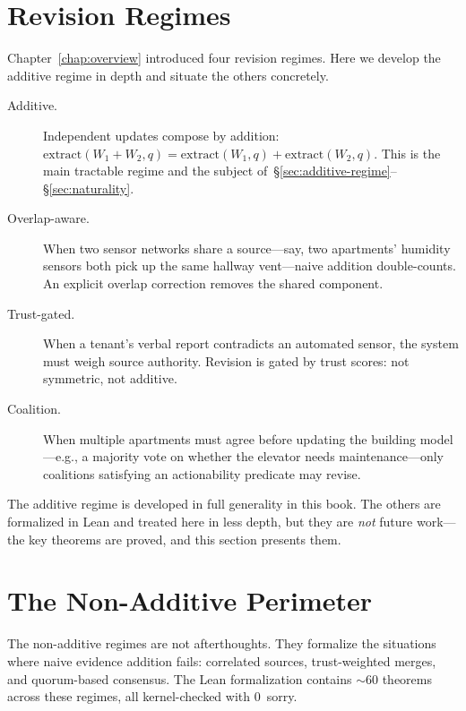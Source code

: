 \documentclass[11pt,openany]{report}
\begin{document}
\section{Revision Regimes}

Chapter~\ref{chap:overview} introduced four revision regimes.  Here
we develop the additive regime in depth and situate the others
concretely.

\begin{description}
\item[Additive.]  Independent updates compose by addition:
  $\mathrm{extract}(W_1 + W_2, q) = \mathrm{extract}(W_1, q) +
  \mathrm{extract}(W_2, q)$.  This is the main tractable regime and
  the subject of~\S\ref{sec:additive-regime}--\S\ref{sec:naturality}.

\item[Overlap-aware.]  When two sensor networks share a source---say,
  two apartments' humidity sensors both pick up the same hallway
  vent---naive addition double-counts.  An explicit overlap correction
  removes the shared component.

\item[Trust-gated.]  When a tenant's verbal report contradicts an
  automated sensor, the system must weigh source authority.  Revision
  is gated by trust scores: not symmetric, not additive.

\item[Coalition.]  When multiple apartments must agree before updating
  the building model---e.g., a majority vote on whether the elevator
  needs maintenance---only coalitions satisfying an actionability
  predicate may revise.
\end{description}

\noindent
The additive regime is developed in full generality in this book.
The others are formalized in Lean and treated here in less depth,
but they are \emph{not} future work---the key theorems are
proved, and this section presents them.


\section{The Non-Additive Perimeter}
\label{sec:non-additive}

The non-additive regimes are not afterthoughts.  They formalize
the situations where naive evidence addition fails: correlated
sources, trust-weighted merges, and quorum-based consensus.  The
Lean formalization contains $\sim$60 theorems across these
regimes, all kernel-checked with 0~sorry.
\end{document}
